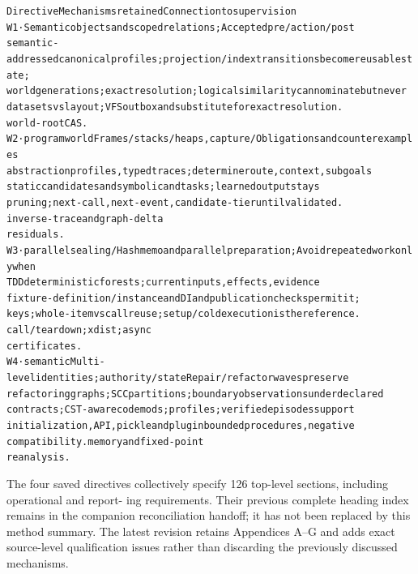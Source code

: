 \begingroup\fontsize{7}{8.4}\selectfont
\begin{alltt}
Directive                 Mechanisms retained                       Connection to supervision
W1 ·                      Semantic objects and scoped relations;    Accepted pre/action/post
semantic-addressed        canonical profiles; projection/index      transitions become reusable state;
world                     generations; exact resolution; logical    similarity can nominate but never
                          datasets vs layout; VFS outbox and        substitute for exact resolution.
                          world-root CAS.
W2 · program world        Frames/stacks/heaps, capture/             Obligations and counterexamples
                          abstraction profiles, typed traces;       determine route, context, subgoals
                          static candidates and symbolic            and tasks; learned output stays
                          pruning; next-call, next-event,           candidate-tier until validated.
                          inverse-trace and graph-delta
                          residuals.
W3 · parallel sealing /   Hash memo and parallel preparation;       Avoid repeated work only when
TDD                       deterministic forests;                    current inputs, effects, evidence
                          fixture-definition/instance and DI        and publication checks permit it;
                          keys; whole-item vs call reuse; setup/    cold execution is the reference.
                          call/teardown; xdist; async
                          certificates.
W4 · semantic             Multi-level identities; authority/state   Repair/refactor waves preserve
refactoring               graphs; SCC partitions; boundary          observations under declared
                          contracts; CST-aware codemods;            profiles; verified episodes support
                          initialization, API, pickle and plugin    bounded procedures, negative
                          compatibility.                            memory and fixed-point
                                                                    reanalysis.
\end{alltt}\endgroup


The four saved directives collectively specify 126 top-level sections, including operational and report-
ing requirements. Their previous complete heading index remains in the companion reconciliation
handoff; it has not been replaced by this method summary. The latest revision retains Appendices
A–G and adds exact source-level qualification issues rather than discarding the previously discussed
mechanisms.

